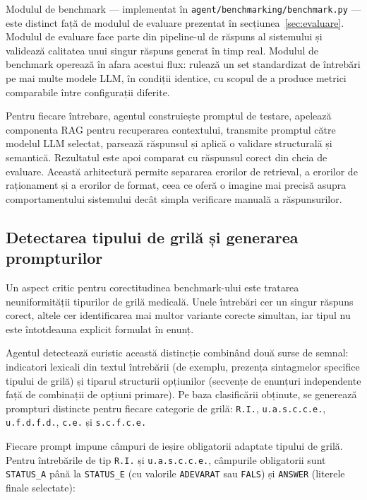 \documentclass[12pt, a4paper, oneside, romanian]{teza-upb}
\begin{document}
Modulul de benchmark --- implementat în \texttt{agent/benchmarking/benchmark.py} --- este distinct față de modulul de evaluare prezentat în secțiunea~\ref{sec:evaluare}. Modulul de evaluare face parte din pipeline-ul de răspuns al sistemului și validează calitatea unui singur răspuns generat în timp real. Modulul de benchmark operează în afara acestui flux: rulează un set standardizat de întrebări pe mai multe modele LLM, în condiții identice, cu scopul de a produce metrici comparabile între configurații diferite.

Pentru fiecare întrebare, agentul construiește promptul de testare, apelează componenta RAG pentru recuperarea contextului, transmite promptul către modelul LLM selectat, parsează răspunsul și aplică o validare structurală și semantică. Rezultatul este apoi comparat cu răspunsul corect din cheia de evaluare. Această arhitectură permite separarea erorilor de retrieval, a erorilor de raționament și a erorilor de format, ceea ce oferă o imagine mai precisă asupra comportamentului sistemului decât simpla verificare manuală a răspunsurilor.

\subsection{Detectarea tipului de grilă și generarea prompturilor}

Un aspect critic pentru corectitudinea benchmark-ului este tratarea neuniformității tipurilor de grilă medicală. Unele întrebări cer un singur răspuns corect, altele cer identificarea mai multor variante corecte simultan, iar tipul nu este întotdeauna explicit formulat în enunț.

Agentul detectează euristic această distincție combinând două surse de semnal: indicatori lexicali din textul întrebării (de exemplu, prezența sintagmelor specifice tipului de grilă) și tiparul structurii opțiunilor (secvențe de enunțuri independente față de combinații de opțiuni primare). Pe baza clasificării obținute, se generează prompturi distincte pentru fiecare categorie de grilă: \texttt{R.I.}, \texttt{u.a.s.c.c.e.}, \texttt{u.f.d.f.d.}, \texttt{c.e.} și \texttt{s.c.f.c.e.}

Fiecare prompt impune câmpuri de ieșire obligatorii adaptate tipului de grilă. Pentru întrebările de tip \texttt{R.I.} și \texttt{u.a.s.c.c.e.}, câmpurile obligatorii sunt \texttt{STATUS\_A} până la \texttt{STATUS\_E} (cu valorile \texttt{ADEVARAT} sau \texttt{FALS}) și \texttt{ANSWER} (literele finale selectate):
\end{document}
